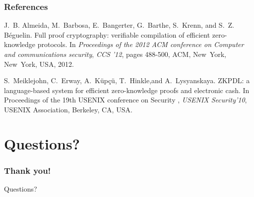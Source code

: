 \documentclass{beamer}
\begin{document}
\begin{frame} 
        \frametitle{References} 
        
        \begin{thebibliography}{lskdjf}
        
J.~B. Almeida, M.~Barbosa, E.~Bangerter, G.~Barthe, S.~Krenn, and S.~Z. B{\'e}guelin.
\newblock Full proof cryptography: verifiable compilation of efficient zero-knowledge protocols.
\newblock In \textit{Proceedings of the 2012 ACM conference on Computer and communications security}, {\em CCS '12}, pages 488-500, ACM, New~York, New~York, USA, 2012.
        
        S.~Meiklejohn, C.~Erway, A.~K\"{u}p\c{c}\"{u}, T.~Hinkle,and A.~Lysyanskaya.
\newblock ZKPDL: a language-based system for efficient zero-knowledge proofs and electronic cash.
\newblock In Proceedings of the 19th USENIX conference on Security , {\em USENIX Security'10}, USENIX Association, Berkeley, CA, USA.
  
          \end{thebibliography}

\end{frame}

\section*{Questions?}

\begin{frame}
	\frametitle{Thank you!}
	\Large{Questions?}
\end{frame}
\end{document}
